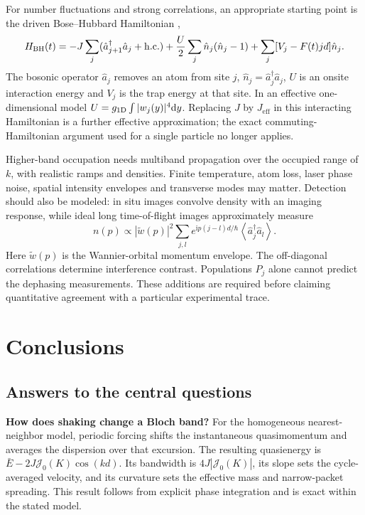 \documentclass[11pt,oneside]{report}
\numberwithin{equation}{chapter}
\newcommand{\Jeff}{J_{\mathrm{eff}}}
\newcommand{\ii}{\mathrm i}
\newcommand{\dd}{\mathrm d}
\newcommand{\avg}[1]{\left\langle #1\right\rangle}
\begin{document}
For number fluctuations and strong correlations, an appropriate starting point is the driven Bose--Hubbard Hamiltonian \cite{Jaksch1998},
\begin{equation}
 H_{\rm BH}(t)=-J\sum_j(\hat a_{j+1}^\dagger\hat a_j+\mathrm{h.c.})+
 \frac{U}{2}\sum_j\hat n_j(\hat n_j-1)+\sum_j[V_j-F(t)jd]\hat n_j.
\end{equation}
The bosonic operator $\hat a_j$ removes an atom from site $j$, $\hat n_j=\hat a_j^\dagger\hat a_j$, $U$ is an onsite interaction energy and $V_j$ is the trap energy at that site. In an effective one-dimensional model $U=g_{1\rm D}\int|w_j(y)|^4\dd y$. Replacing $J$ by $\Jeff$ in this interacting Hamiltonian is a further effective approximation; the exact commuting-Hamiltonian argument used for a single particle no longer applies.

Higher-band occupation needs multiband propagation over the occupied range of $k$, with realistic ramps and densities. Finite temperature, atom loss, laser phase noise, spatial intensity envelopes and transverse modes may matter. Detection should also be modeled: in situ images convolve density with an imaging response, while ideal long time-of-flight images approximately measure
\begin{equation}
 n(p)\propto|\widetilde w(p)|^2\sum_{j,l}e^{\ii p(j-l)d/\hbar}\avg{\hat a_j^\dagger\hat a_l}.
\end{equation}
Here $\widetilde w(p)$ is the Wannier-orbital momentum envelope. The off-diagonal correlations determine interference contrast. Populations $P_j$ alone cannot predict the dephasing measurements. These additions are required before claiming quantitative agreement with a particular experimental trace.

\chapter{Conclusions}
\section{Answers to the central questions}
\textbf{How does shaking change a Bloch band?} For the homogeneous nearest-neighbor model, periodic forcing shifts the instantaneous quasimomentum and averages the dispersion over that excursion. The resulting quasienergy is $\bar E-2J\mathcal J_0(K)\cos(kd)$. Its bandwidth is $4J|\mathcal J_0(K)|$, its slope sets the cycle-averaged velocity, and its curvature sets the effective mass and narrow-packet spreading. This result follows from explicit phase integration and is exact within the stated model.
\end{document}
